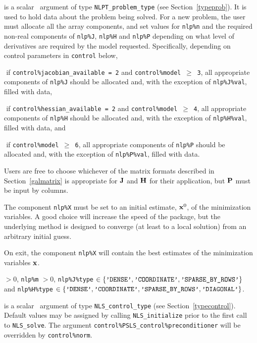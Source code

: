 \documentclass{galahad}
\newcommand{\packagename}{NLS}
\begin{document}
\vspace*{-2mm}
\begin{description}
 is a scalar \intentinout\ argument of type
{\tt NLPT\_problem\_type}
(see Section~\ref{typeprob}).
It is used to hold data about the problem being solved.
For a new problem, the user must allocate all the array components,
and set values for {\tt nlp\%n}
and the required non-real components of
{\tt nlp\%J}, {\tt nlp\%H} and {\tt nlp\%P} depending on what level
of derivatives are required by the model requested. Specifically,
depending on control parameters in {\tt control} below,
\vspace*{-2mm}
\begin{description}
\item $\mbox{}$ if {\tt control\%jacobian\_available = 2} and
{\tt control\%model $\geq$ 3}, all appropriate components of
 {\tt nlp\%J} should be allocated and, with the exception of {\tt nlp\%J\%val},
filled with data,
\item $\mbox{}$ if {\tt control\%hessian\_available = 2} and
{\tt control\%model $\geq$ 4}, all appropriate components of
 {\tt nlp\%H} should be allocated and, with the exception of {\tt nlp\%H\%val},
filled with data, and
\item $\mbox{}$ if {\tt control\%model $\geq$ 6}, all appropriate
 components of {\tt nlp\%P} should be allocated and, with the exception
 of {\tt nlp\%P\%val}, filled with data.
\end{description}
Users are free to choose whichever
of the matrix formats described in Section~\ref{galmatrix}
is appropriate for ${\mathbf{J}}$ and ${\mathbf{H}}$ for their application,
but ${\mathbf{P}}$ must be input by columns.

\noindent
The component {\tt nlp\%X} must be set to an initial estimate, ${\mathbf{x}}^{0}$,
of the minimization variables. A good choice will increase the speed
of the package, but the underlying method is designed to converge (at least
to a local solution) from an arbitrary initial guess.

\noindent
On exit, the component {\tt nlp\%X} will contain the best estimates of the
minimization variables ${\mathbf{x}}$.

\noindent
{} $> 0$, {\tt nlp\%m} $> 0$,
{\tt nlp\%J\%type} $\in \{
  \mbox{\tt 'DENSE'}, \mbox{\tt 'COORDINATE'}, \mbox{\tt 'SPARSE\_BY\_ROWS'}
 \}$ and
{\tt nlp\%H\%type} $\in \{
  \mbox{\tt 'DENSE'}, \mbox{\tt 'COORDINATE'}, \mbox{\tt 'SPARSE\_BY\_ROWS'},
  \mbox{\tt 'DIAGONAL'} \}$.

 is a scalar \intentin\ argument of type
{\tt \packagename\_control\_type}
(see Section~\ref{typecontrol}). Default values may be assigned by calling
{\tt \packagename\_initialize} prior to the first call to
{\tt \packagename\_solve}. The argument
{\tt control\%PSLS\_control\-\%preconditioner}
will be overridden by {\tt control\%norm}.


\end{description}
\end{document}
